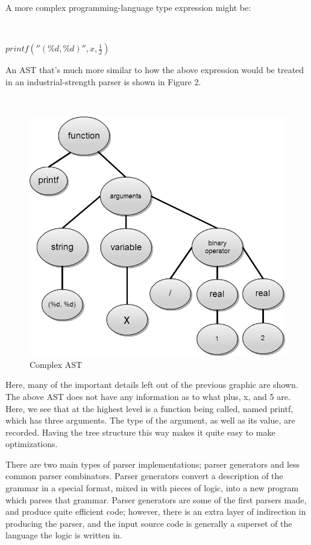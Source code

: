 \documentclass[titlepage]{article}
\begin{document}
			\newpage
			A more complex programming-language type expression might be:
			\newline

			~\centerline{\Large{$printf(''(\%d, \%d)'', x, \frac{1}{2})$}}
			\newline

			An AST that's much more similar to how the above expression would be treated in an industrial-strength parser is shown in Figure 2.
			\newline
			
			\begin{figure}
				\caption{Complex AST}
				~\centerline{\includegraphics[scale=.5]{ExampleCodeAST.png}}
			\end{figure}

			Here, many of the important details left out of the previous graphic are shown.  The above AST does not have any information as to what plus, x, and 5 are.  Here, we see that at the highest level is a function being called, named printf, which has three arguments.  The type of the argument, as well as its value, are recorded.  Having the tree structure this way makes it quite easy to make optimizations.

			There are two main types of parser implementations; parser generators and less common parser combinators.  Parser generators convert a description of the grammar in a special format, mixed in with pieces of logic, into a new program which parses that grammar.  Parser generators are some of the first parsers made, and produce quite efficient code; however, there is an extra layer of indirection in producing the parser, and the input source code is generally a superset of the language the logic is written in.
\end{document}
